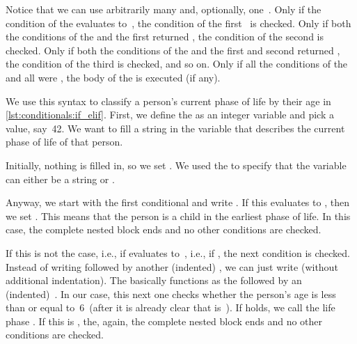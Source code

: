 %
%
Notice that we can use arbitrarily many  and, optionally, one~.
Only if the condition of the  evaluates to~, the condition of the first~ is checked.
Only if both the conditions of the  and the first  returned , the condition of the second  is checked.
Only if both the conditions of the  and the first and second  returned , the condition of the third  is checked, and so on.
Only if all the conditions of the  and all  were , the body of the  is executed (if any).

We use this syntax to classify a person's current phase of life by their age in \cref{lst:conditionals:if_elif}.
First, we define the  as an integer variable and pick a value, say~42.
We want to fill a string in the variable  that describes the current phase of life of that person.

Initially, nothing is filled in, so we set .
We used the   to specify that the variable can either be a string or .

Anyway, we start with the first conditional and write .
If this evaluates to , then we set .
This means that the person is a child in the earliest phase of life.
In this case, the complete nested  block ends and no other conditions are checked.

If this is not the case, i.e., if  evaluates to~, i.e., if , the next condition is checked.
Instead of writing  followed by another (indented) , we can just write  (without additional indentation).
The  basically functions as the  followed by an (indented)~.
In our case, this next one checks whether the person's age is less than or equal to~6~(after it is already clear that  is~).
If  holds, we call the life phase .
If this is , the, again, the complete nested  block ends and no other conditions are checked.

